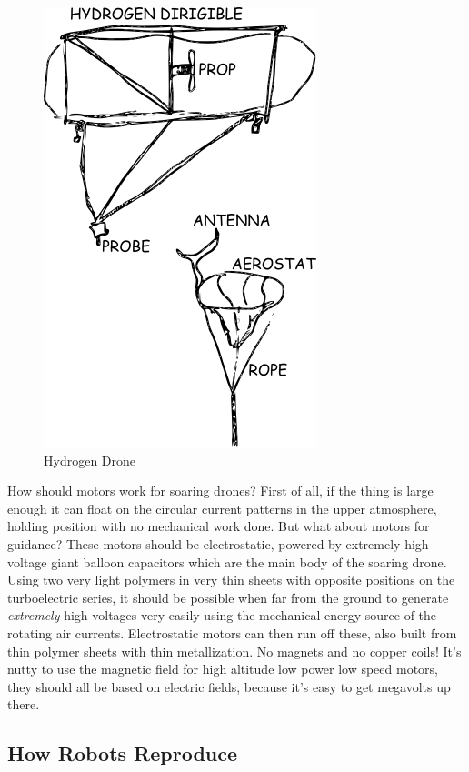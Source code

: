 \begin{figure}[htbp]
\centering
\includegraphics{images/dirigible.png}
\caption{Hydrogen Drone}
\end{figure}

How should motors work for soaring drones? First of all, if the thing is
large enough it can float on the circular current patterns in the upper
atmosphere, holding position with no mechanical work done. But what
about motors for guidance? These motors should be electrostatic, powered
by extremely high voltage giant balloon capacitors which are the main
body of the soaring drone. Using two very light polymers in very thin
sheets with opposite positions on the turboelectric series, it should be
possible when far from the ground to generate \emph{extremely} high
voltages very easily using the mechanical energy source of the rotating
air currents. Electrostatic motors can then run off these, also built
from thin polymer sheets with thin metallization. No magnets and no
copper coils! It's nutty to use the magnetic field for high altitude low
power low speed motors, they should all be based on electric fields,
because it's easy to get megavolts up there.

\subsection{How Robots Reproduce}\label{how-robots-reproduce}

